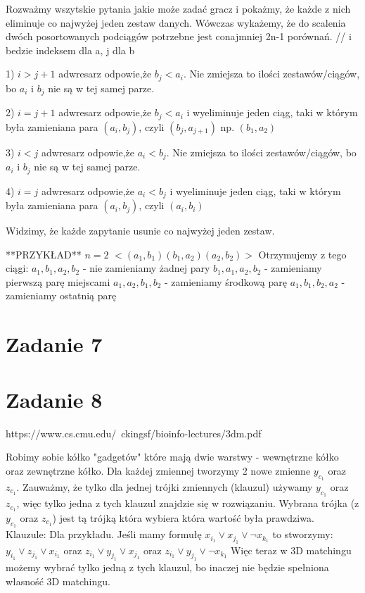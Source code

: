 \documentclass[12pt]{article}
\begin{document}
 Rozważmy wszytskie pytania jakie może zadać gracz i pokażmy, że każde z nich eliminuje co najwyżej jeden zestaw danych. Wówczas wykażemy, że do scalenia dwóch posortowanych podciągów potrzebne jest conajmniej 2n-1 porównań.
 // i bedzie indeksem dla a, j dla b
 
 1) $i>j+1$ adwresarz odpowie,że $b_j<a_i$. Nie zmiejsza to ilości zestawów/ciągów, bo $a_i$ i $b_j$ nie są w tej samej parze.
 
 2) $i=j+1$ adwresarz odpowie,że $b_j<a_i$ i wyeliminuje jeden ciąg, taki w którym była zamieniana para $(a_i, b_j)$, czyli $(b_j, a_{j+1})$  np. $(b_1, a_2)$
 
 3) $i<j$ adwresarz odpowie,że $a_i<b_j$. Nie zmiejsza to ilości zestawów/ciągów, bo $a_i$ i $b_j$ nie są w tej samej parze.

 4) $i=j$ adwresarz odpowie,że $a_i<b_j$ i wyeliminuje jeden ciąg, taki w którym była zamieniana para $(a_i,b_j)$, czyli $(a_i, b_i)$
 
Widzimy, że każde zapytanie usunie co najwyżej jeden zestaw. 

**PRZYKŁAD**
$n = 2$
$<(a_1, b_1)(b_1, a_2)(a_2, b_2)>$
Otrzymujemy z tego ciągi:
$a_1, b_1, a_2, b_2$ - nie zamieniamy żadnej pary
$b_1, a_1, a_2, b_2$ - zamieniamy pierwszą parę miejscami
$a_1, a_2, b_1, b_2$ - zamieniamy środkową parę
$a_1, b_1, b_2, a_2$ - zamieniamy ostatnią parę

\section{Zadanie 7}

\section{Zadanie 8}

https://www.cs.cmu.edu/~ckingsf/bioinfo-lectures/3dm.pdf

Robimy sobie kółko "gadgetów" które mają dwie warstwy - wewnętrzne kółko oraz zewnętrzne kółko.
Dla każdej zmiennej tworzymy 2 nowe zmienne $y_{c_1}$ oraz $z_{c_1}$. Zauważmy, że tylko dla jednej trójki zmiennych (klauzul) używamy $y_{c_1}$ oraz $z_{c_1}$, więc tylko jedna z tych klauzul znajdzie się w rozwiązaniu. Wybrana trójka (z $y_{c_1}$ oraz $z_{c_1}$) jest tą trójką która wybiera która wartość była prawdziwa. \\
Klauzule:
Dla przykładu. Jeśli mamy formułę $x_{i_1} \lor x_{j_1} \lor \lnot x_{k_1}$ to stworzymy:
$y_{i_1} \lor z_{j_1} \lor x_{i_1}$ oraz $z_{i_1} \lor y_{j_1} \lor x_{j_1}$ oraz $z_{i_1} \lor y_{j_1} \lor \lnot x_{k_1}$  
Więc teraz w 3D matchingu możemy wybrać tylko jedną z tych klauzul, bo inaczej nie będzie spełniona własność 3D matchingu.\\
\end{document}

